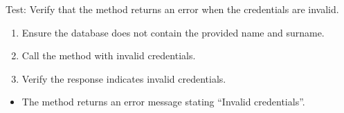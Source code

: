 \documentclass[letterpaper,10pt,english]{sphinxmanual}
\begin{document}
\begin{fulllineitems}
\label{\detokenize{test:test.test_residetnt.test_login_invalid_credentials}}
\pysigstartsignatures
\pysiglinewithargsret
{}
{}
{}
\pysigstopsignatures
\sphinxAtStartPar
Test: Verify that the method returns an error when the credentials are invalid.
\begin{description}
\begin{enumerate}
%
\item {} 
\sphinxAtStartPar
Ensure the database does not contain the provided name and surname.

\item {} 
\sphinxAtStartPar
Call the  method with invalid credentials.

\item {} 
\sphinxAtStartPar
Verify the response indicates invalid credentials.

\end{enumerate}

\begin{itemize}
\item {} 
\sphinxAtStartPar
The method returns an error message stating “Invalid credentials”.

\end{itemize}

\end{description}

\end{fulllineitems}

\end{document}
